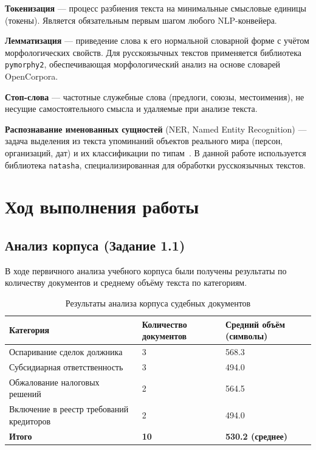 \documentclass[12pt, a4paper]{report}
\begin{document}
\textbf{Токенизация} — процесс разбиения текста на минимальные смысловые единицы (токены).
Является обязательным первым шагом любого NLP-конвейера.

\textbf{Лемматизация} — приведение слова к его нормальной словарной форме с учётом
морфологических свойств. Для русскоязычных текстов применяется библиотека \texttt{pymorphy2},
обеспечивающая морфологический анализ на основе словарей OpenCorpora.

\textbf{Стоп-слова} — частотные служебные слова (предлоги, союзы, местоимения),
не несущие самостоятельного смысла и удаляемые при анализе текста.

\textbf{Распознавание именованных сущностей} (NER, Named Entity Recognition) —
задача выделения из текста упоминаний объектов реального мира (персон, организаций,
дат) и их классификации по типам~\cite{lec1}. В данной работе используется библиотека
\texttt{natasha}, специализированная для обработки русскоязычных текстов.

\chapter{Ход выполнения работы}

\section{Анализ корпуса (Задание 1.1)}

В ходе первичного анализа учебного корпуса были получены результаты по количеству документов и
среднему объёму текста по категориям.

\begin{table}[h]
  \centering
  \caption{Результаты анализа корпуса судебных документов}
  \label{tab:corpus_analysis}
  \begin{tabularx}{0.9\textwidth}{l X X}
    \toprule
    \rowcolor{LightBlue}
    \textsf{\textbf{Категория}} &
    \textsf{\textbf{Количество документов}} &
    \textsf{\textbf{Средний объём (символы)}} \\
    \midrule
    Оспаривание сделок должника & 3 & 568.3 \\
    Субсидиарная ответственность & 3 & 494.0 \\
    Обжалование налоговых решений & 2 & 564.5 \\
    Включение в реестр требований кредиторов & 2 & 494.0 \\
    \midrule
    \textbf{Итого} & \textbf{10} & \textbf{530.2 (среднее)} \\
    \bottomrule
  \end{tabularx}
\end{table}
\end{document}
